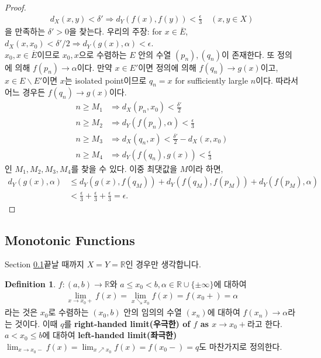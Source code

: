 \documentclass[12pt]{article}
\theoremstyle{definition}
\newtheorem{defn}[thm]{Definition}
\def\RR{\mathbb{R}}
\def\eps{\epsilon}
\begin{document}
\begin{proof}
	\begin{gather*}
		d_X(x, y) < \delta' \Longrightarrow d_Y (f(x), f(y)) < \frac{\eps}{3} \quad (x, y \in X)
	\end{gather*}
	을 만족하는 \(\delta' > 0\)을 찾는다. 우리의 주장: for \(x \in \overline{E}\), \(d_X (x, x_0) < \delta' / 2 \Longrightarrow d_Y (g(x), \alpha) < \eps\).\\
	\(x_0, x \in \overline{E}\)이므로 \(x_0, x\)으로 수렴하는 \(E\) 안의 수열 \((p_n), (q_n)\)이 존재한다. 또 정의에 의해 \(f(p_n) \rightarrow \alpha\)이다. 만약 \(x \in E'\)이면 정의에 의해 \(f(q_n) \rightarrow g(x)\)이고, \(x \in E \backslash E'\)이면 \(x\)는 isolated point이므로 \(q_n = x\) for sufficiently largle \(n\)이다. 따라서 어느 경우든 \(f(q_n) \rightarrow g(x)\)이다.
	\begin{align*}
		n \ge M_1 &\Longrightarrow d_X (p_n, x_0) < \frac{\delta'}{2}\\
		n \ge M_2 &\Longrightarrow d_Y (f(p_n), \alpha) < \frac{\eps}{3}\\
		n \ge M_3 &\Longrightarrow d_X (q_n, x) < \frac{\delta'}{2} - d_X (x, x_0)\\
		n \ge M_4 &\Longrightarrow d_Y (f(q_n), g(x)) < \frac{\eps}{3}
	\end{align*}
	인 \(M_1, M_2, M_3, M_4\)를 찾을 수 있다. 이중 최댓값을 \(M\)이라 하면,
	\begin{align*}
		d_Y (g(x), \alpha) &\le d_Y (g(x), f(q_M)) + d_Y (f(q_M), f(p_M)) + d_Y (f(p_M), \alpha)\\
		&< \frac{\eps}{3} + \frac{\eps}{3} + \frac{\eps}{3} = \eps.
	\end{align*}
\end{proof}

\subsection{Monotonic Functions} \label{sec mono}

Section \ref{sec mono}\이 끝날 때까지 \(X = Y = \RR\)인 경우만 생각합니다.

\begin{defn}
	\(f: (a, b) \rightarrow \RR\)와 \(a \le x_0 < b, \alpha \in \RR \cup \{\pm \infty\}\)에 대하여
	\begin{gather*}
		\lim_{x \rightarrow x_0+} f(x) = \lim_{x \searrow x_0} f(x) = f(x_0+) = \alpha
	\end{gather*}
	라는 것은 \(x_0\)로 수렴하는 \((x_0, b)\) 안의 임의의 수열 \((x_n)\)에 대하여 \(f(x_n) \rightarrow \alpha\)라는 것이다. 이때 \(q\)를 \textbf{right-handed limit(우극한) of \(f\) as \(x \rightarrow x_0+\)}라고 한다.\\
	\(a < x_0 \le b\)에 대하여 \textbf{left-handed limit(좌극한)} \(\lim_{x \rightarrow x_0-} f(x) = \lim_{x \nearrow x_0} f(x) = f(x_0-) = q\)도 마찬가지로 정의한다.
\end{defn}
\end{document}
